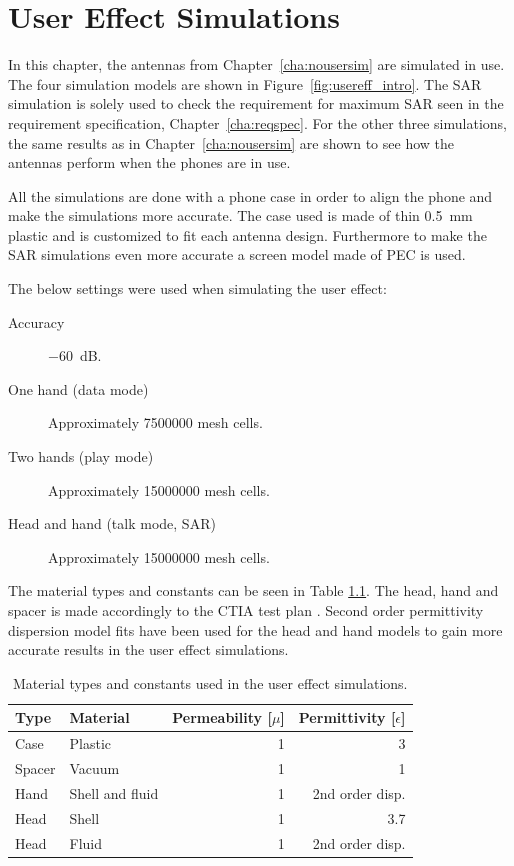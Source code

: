 \chapter{User Effect Simulations}
\label{cha:usereff}
In this chapter, the antennas from Chapter~\ref{cha:nousersim} are simulated in use.
The four simulation models are shown in Figure~\ref{fig:usereff_intro}. The SAR simulation is solely used to check the requirement for maximum SAR seen in the requirement specification, Chapter~\ref{cha:reqspec}. For the other three simulations, the same results as in Chapter~\ref{cha:nousersim} are shown to see how the antennas perform when the phones are in use.

All the simulations are done with a phone case in order to align the phone and make the simulations more accurate. The case used is made of thin \SI{0.5}{mm} plastic and is customized to fit each antenna design. Furthermore to make the SAR simulations even more accurate a screen model made of PEC is used.  

The below settings were used when simulating the user effect:
\begin{description}
\item[Accuracy] \SI{-60}{dB}.
\item[One hand (data mode)] Approximately \num{7500000} mesh cells.
\item[Two hands (play mode)] Approximately \num{15000000} mesh cells.
\item[Head and hand (talk mode, SAR)] Approximately \num{15000000} mesh cells.
\end{description}

The material types and constants can be seen in Table \ref{tab:cst_material}. The head, hand and spacer is made accordingly to the CTIA test plan \cite{cita2015}. Second order permittivity dispersion model fits have been used for the head and hand models to gain more accurate results in the user effect simulations.

\begin{table}
  \centering
  \begin{tabular}{|l|l|r|r|}
    \hline
    Type & Material & Permeability [$\mu$] & Permittivity [$\epsilon$] \\
    \hline
    Case      & Plastic  & 1    & 3       \\
    Spacer    & Vacuum   & 1    & 1       \\
    Hand      & Shell and fluid   & 1    & 2nd order disp.     \\
    Head      & Shell    & 1    & 3.7     \\
    Head      & Fluid    & 1    & 2nd order disp.     \\ 
    \hline
  \end{tabular}
  \caption{Material types and constants used in the user effect simulations.}
  \label{tab:cst_material}
\end{table}


